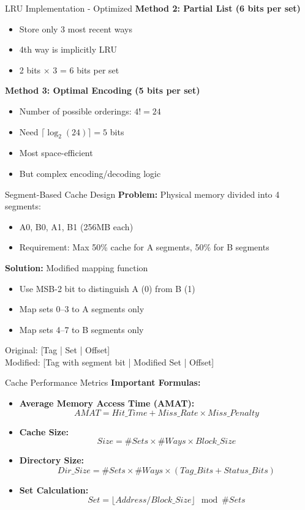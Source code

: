 \documentclass[aspectratio=169,12pt]{beamer}
\begin{document}
\begin{frame}{LRU Implementation - Optimized}
\textbf{Method 2: Partial List (6 bits per set)}
\begin{itemize}
    \item Store only 3 most recent ways
    \item 4th way is implicitly LRU
    \item 2 bits $\times$ 3 = 6 bits per set
\end{itemize}

\textbf{Method 3: Optimal Encoding (5 bits per set)}
\begin{itemize}
    \item Number of possible orderings: $4! = 24$
    \item Need $\lceil \log_2(24) \rceil = 5$ bits
    \item Most space-efficient
    \item But complex encoding/decoding logic
\end{itemize}
\end{frame}

\begin{frame}{Segment-Based Cache Design}
\textbf{Problem:} Physical memory divided into 4 segments:
\begin{itemize}
    \item A0, B0, A1, B1 (256MB each)
    \item Requirement: Max 50\% cache for A segments, 50\% for B segments
\end{itemize}

\textbf{Solution:} Modified mapping function
\begin{itemize}
    \item Use MSB-2 bit to distinguish A (0) from B (1)
    \item Map sets 0--3 to A segments only
    \item Map sets 4--7 to B segments only
\end{itemize}

Original: [Tag | Set | Offset]\\
Modified: [Tag with segment bit | Modified Set | Offset]
\end{frame}

\begin{frame}{Cache Performance Metrics}
\textbf{Important Formulas:}
\begin{itemize}
    \item \textbf{Average Memory Access Time (AMAT):}
    $$AMAT = Hit\_Time + Miss\_Rate \times Miss\_Penalty$$
    
    \item \textbf{Cache Size:}
    $$Size = \#Sets \times \#Ways \times Block\_Size$$
    
    \item \textbf{Directory Size:}
    $$Dir\_Size = \#Sets \times \#Ways \times (Tag\_Bits + Status\_Bits)$$
    
    \item \textbf{Set Calculation:}
    $$Set = \lfloor Address / Block\_Size \rfloor \mod \#Sets$$
\end{itemize}
\end{frame}
\end{document}
